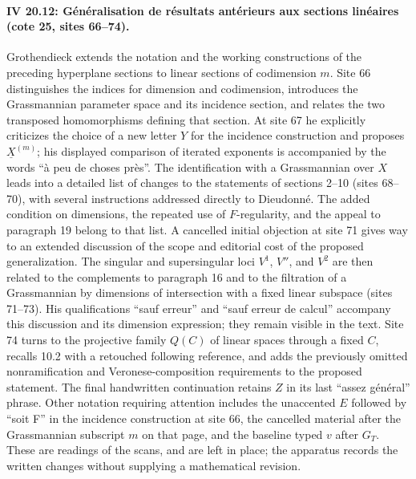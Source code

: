 \paragraph{IV 20.12: Généralisation de résultats antérieurs aux sections linéaires (cote 25, sites 66--74).}
Grothendieck extends the notation and the working constructions of the preceding hyperplane sections to linear sections of codimension $m$. Site 66 distinguishes the indices for dimension and codimension, introduces the Grassmannian parameter space and its incidence section, and relates the two transposed homomorphisms defining that section. At site 67 he explicitly criticizes the choice of a new letter $Y$ for the incidence construction and proposes $\underline{X}^{(m)}$; his displayed comparison of iterated exponents is accompanied by the words ``à peu de choses près''. The identification with a Grassmannian over $X$ leads into a detailed list of changes to the statements of sections 2--10 (sites 68--70), with several instructions addressed directly to Dieudonné. The added condition on dimensions, the repeated use of $F$-regularity, and the appeal to paragraph 19 belong to that list. A cancelled initial objection at site 71 gives way to an extended discussion of the scope and editorial cost of the proposed generalization. The singular and supersingular loci $V^1$, $V''$, and $V^2$ are then related to the complements to paragraph 16 and to the filtration of a Grassmannian by dimensions of intersection with a fixed linear subspace (sites 71--73). His qualifications ``sauf erreur'' and ``sauf erreur de calcul'' accompany this discussion and its dimension expression; they remain visible in the text. Site 74 turns to the projective family $Q(C)$ of linear spaces through a fixed $C$, recalls 10.2 with a retouched following reference, and adds the previously omitted nonramification and Veronese-composition requirements to the proposed statement. The final handwritten continuation retains $Z$ in its last ``assez général'' phrase. Other notation requiring attention includes the unaccented $E$ followed by ``soit F'' in the incidence construction at site 66, the cancelled material after the Grassmannian subscript $m$ on that page, and the baseline typed $v$ after $G_T$. These are readings of the scans, and are left in place; the apparatus records the written changes without supplying a mathematical revision.
